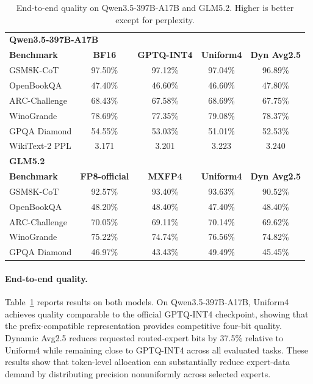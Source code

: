 \documentclass[sigconf, nonacm]{acmart}
\begin{document}
\begin{table}[t]
\centering
\small
\setlength{\tabcolsep}{3pt}
\caption{End-to-end quality on Qwen3.5-397B-A17B and GLM5.2. Higher is better except
for perplexity.}
\label{tab:quality}
\begin{tabular}{lcccc}
\toprule
\multicolumn{5}{l}{\textbf{Qwen3.5-397B-A17B}} \\
\textbf{Benchmark} & \textbf{BF16} & \textbf{GPTQ-INT4} &
\textbf{Uniform4} & \textbf{Dyn Avg2.5} \\
\midrule
GSM8K-CoT      & 97.50\% & 97.12\% & 97.04\% & 96.89\% \\
OpenBookQA     & 47.40\% & 46.60\% & 46.60\% & 47.80\% \\
ARC-Challenge  & 68.43\% & 67.58\% & 68.69\% & 67.75\% \\
WinoGrande     & 78.69\% & 77.35\% & 79.08\% & 78.37\% \\
GPQA Diamond   & 54.55\% & 53.03\% & 51.01\% & 52.53\% \\
WikiText-2 PPL & 3.171   & 3.201   & 3.223   & 3.240   \\
\midrule
\multicolumn{5}{l}{\textbf{GLM5.2}} \\
\textbf{Benchmark} & \textbf{FP8-official} & \textbf{MXFP4} &
\textbf{Uniform4} & \textbf{Dyn Avg2.5} \\
\midrule
GSM8K-CoT      & 92.57\% & 93.40\% & 93.63\% & 90.52\% \\
OpenBookQA     & 48.20\% & 48.40\% & 47.40\% & 48.40\% \\
ARC-Challenge  & 70.05\% & 69.11\% & 70.14\% & 69.62\% \\
WinoGrande     & 75.22\% & 74.74\% & 76.56\% & 74.82\% \\
GPQA Diamond   & 46.97\% & 43.43\% & 49.49\% & 45.45\% \\
\bottomrule
\end{tabular}
\end{table}


\paragraph{End-to-end quality.}
Table~\ref{tab:quality} reports results on both models. On
Qwen3.5-397B-A17B, Uniform4 achieves quality comparable to the
official GPTQ-INT4 checkpoint, showing that the prefix-compatible
representation provides competitive four-bit quality. Dynamic Avg2.5
reduces requested routed-expert bits by 37.5\% relative to Uniform4
while remaining close to GPTQ-INT4 across all evaluated tasks. These
results show that token-level allocation can substantially reduce
expert-data demand by distributing precision nonuniformly across
selected experts.
\end{document}

